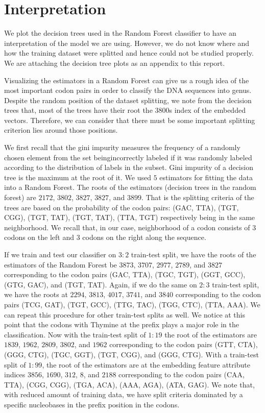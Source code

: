 \documentclass[oneside, twocolumn, a4paper, 10pt]{IEEEtran}
\begin{document}
\section{Interpretation} 
We plot the decision trees used in the Random Forest classifier to have an interpretation of the model we are using. However, we do not know where and how the training dataset were splitted and hence could not be studied properly. We are attaching the decision tree plots as an appendix to this report.\\
\par 
Visualizing the estimators in a Random Forest can give us a rough idea of the most important codon pairs in order to classify the DNA sequences into genus. Despite the random position of the dataset splitting, we note from the decision trees that, most of the trees have their root the $3800$s index of the embedded vectors. Therefore, we can consider that there must be some important splitting criterion lies around those positions.\\
\par 
We first recall that the gini impurity measures the frequency of a randomly chosen element from the set beingincorrectly labeled if it was randomly labeled according to the distribution of labels in the subset. Gini impurity of a decision tree is the maximum at the root of it. We used $5$ estimators for fitting the data into a Random Forest. The roots of the estimators (decision trees in the random forest) are $2172$, $3802$, $3827$, $3827$, and $3899$. That is the splitting criteria of the trees are based on the probability of the codon pairs: (GAC, TTA), (TGT, CGG), (TGT, TAT), (TGT, TAT), (TTA, TGT) respectively being in the same neighborhood. We recall that, in our case, neighborhood of a codon consists of $3$ codons on the left and $3$ codons on the right along the sequence.\\
\par 
If we train and test our classifier on $3:2$ train-test split, we have the roots of the estimators of the Random Forest be $3873$, $3707$, $2977$, $2789$, and $3827$ corresponding to the codon pairs (GAC, TTA), (TGC, TGT), (GGT, GCC), (GTG, GAC), and (TGT, TAT). Again, if we do the same on $2:3$ train-test split, we have the roots at $2294$, $3813$, $4017$, $3741$, and $3840$ corresponding to the codon pairs (TCG, GAT), (TGT, GCC), (TTG, TAC), (TGG, CTC), (TTA, AAA). We can repeat this procedure for other train-test splits as well. We notice at this point that the codons with Thymine at the prefix plays a major role in the classification. Now with the train-test split of $1:19$ the root of the estimators are $1839$, $1962$, $2809$, $3802$, and $1962$ corresponding to the codon pairs (GTT, CTA), (GGG, CTG), (TGC, GGT), (TGT, CGG), and (GGG, CTG). With a train-test split of $1:99$, the root of the estimators are at the embedding feature attribute indices $3856$, $1690$, $312$, $8$, and $2188$ corresponding to the codon pairs (CAA, TTA), (CGG, CGG), (TGA, ACA), (AAA, AGA), (ATA, GAG). We note that, with reduced amount of training data, we have split criteria dominated by a specific nucleobases in the prefix position in the codons.\\
\end{document}
